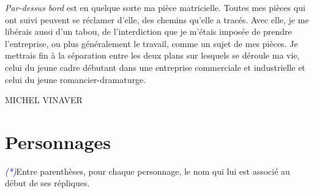\documentclass[a4paper]{report}
\newcommand{\annot}[1]{{\footnotesize \textcolor{blue}{\textit{(#1)}}}}
\begin{document}
\textit{Par-dessus bord} est en quelque sorte ma pièce matricielle. Toutes mes pièces qui ont suivi peuvent se réclamer d'elle, des chemins qu'elle a tracés. Avec elle, je me libérais aussi d'un tabou, de l'interdiction que je m'étais imposée de prendre l'entreprise, ou plus généralement le travail, comme un sujet de mes pièces. Je mettrais fin à la séparation entre les deux plans sur lesquels se déroule ma vie, celui du jeune cadre débutant dans une entreprise commerciale et industrielle et celui du jeune romancier-dramaturge.

\begin{flushright}
MICHEL VINAVER
\end{flushright}

\chapter*{Personnages}

\annot*{Entre parenthèses, pour chaque personnage, le nom qui lui est associé au début de ses répliques.}
\end{document}
